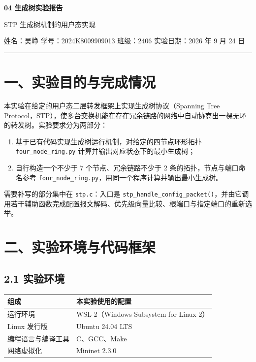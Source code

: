 \documentclass[UTF8,12pt,a4paper,fontset=fandol]{ctexart}
\begin{document}
\begin{center}
  {\bfseries\color{PrimaryBlue} 04 生成树实验报告\par}
  \vspace{0.35em}
  {\large STP 生成树机制的用户态实现\par}
  \vspace{0.9em}
  {\small 姓名：吴峥 \hfill 学号：2024K8009909013 \hfill 班级：2406 \hfill 实验日期：2026 年 9 月 24 日\par}
\end{center}
\vspace{0.2em}
\hrule
\vspace{1.1em}

\section*{一、实验目的与完成情况}

本实验在给定的用户态二层转发框架上实现生成树协议（Spanning Tree Protocol，STP），使多台交换机能在存在冗余链路的网络中自动协商出一棵无环的转发树。实验要求分为两部分：

\begin{enumerate}[leftmargin=1.9em]
  \item 基于已有代码实现生成树运行机制，对给定的四节点环形拓扑 \texttt{four\_node\_ring.py} 计算并输出对应状态下的最小生成树；
  \item 自行构造一个不少于 7 个节点、冗余链路不少于 2 条的拓扑，节点与端口命名参考 \texttt{four\_node\_ring.py}，用同一个程序计算并输出最小生成树。
\end{enumerate}

需要补写的部分集中在 \texttt{stp.c}：入口是 \texttt{stp\_handle\_config\_packet()}，并由它调用若干辅助函数完成配置报文解码、优先级向量比较、根端口与指定端口的重新选举。

\section*{二、实验环境与代码框架}

\subsection*{2.1 实验环境}

{\small\setlength{\parindent}{0pt}
\begin{tabular}{@{}L{0.26\textwidth}L{0.66\textwidth}@{}}
\toprule
{}\textbf{组成} & \textbf{本实验使用的配置}\\
\midrule
运行环境 & WSL 2（Windows Subsystem for Linux 2）\\
Linux 发行版 & Ubuntu 24.04 LTS\\
编程语言与编译工具 & C、GCC、Make\\
网络虚拟化 & Mininet 2.3.0\\
\bottomrule
\end{tabular}}
\end{document}

